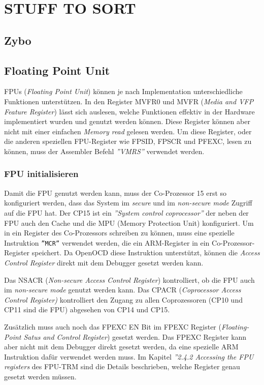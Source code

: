 \chapter{STUFF TO SORT}

\section{Zybo}


\section{Floating Point Unit}
FPUs (\textit{Floating Point  Unit}) können je nach Implementation unterschiedliche Funktionen unterstützen.
In den Register MVFR0 und MVFR (\textit{Media and VFP Feature Register}) lässt sich auslesen, welche Funktionen effektiv in der Hardware implementiert wurden und genutzt werden können.
Diese Register können aber nicht mit einer einfachen \textit{Memory read} gelesen werden.
Um diese Register, oder die anderen speziellen FPU-Register wie FPSID, FPSCR und PFEXC, lesen zu können, muss der Assembler Befehl \textit{''VMRS''} verwendet werden.

\subsection{FPU initialisieren}
Damit die FPU genutzt werden kann, muss der Co-Prozessor 15 erst so konfiguriert werden, dass das System im \textit{secure} und im \textit{non-secure mode} Zugriff auf die FPU hat.
Der CP15 ist ein \textit{''System control coprocessor''} der neben der FPU auch den Cache und die MPU (Memory Protection Unit) konfiguriert.
Um in ein Register des Co-Prozessors schreiben zu können, muss eine spezielle Instruktion \texttt{''MCR''} verwendet werden, die ein ARM-Register in ein Co-Prozessor-Register speichert.
Da OpenOCD diese Instruktion unterstützt, können die \textit{Access Control Register} direkt mit dem Debugger gesetzt werden kann.

Das NSACR (\textit{Non-secure Access Control Register}) kontrolliert, ob die FPU auch im \textit{non-secure mode} genutzt werden kann.
Das CPACR (\textit{Coprocessor Access Control Register)} kontrolliert den Zugang zu allen Coprozessoren (CP10 und CP11 sind die FPU) abgesehen von CP14 und CP15.

Zusätzlich muss auch noch das FPEXC EN Bit im FPEXC Register (\textit{Floating-Point Satus and Control Register}) gesetzt werden.
Das FPEXC Register kann aber nicht mit dem Debugger direkt gesetzt werden, da eine spezielle ARM Instruktion dafür verwendet werden muss.
Im Kapitel \textit{''2.4.2 Accessing the FPU registers} des FPU-TRM\cite{bib:FPUTechnicalReferenceManual} sind die Details beschrieben, welche Register genau gesetzt werden müssen.

